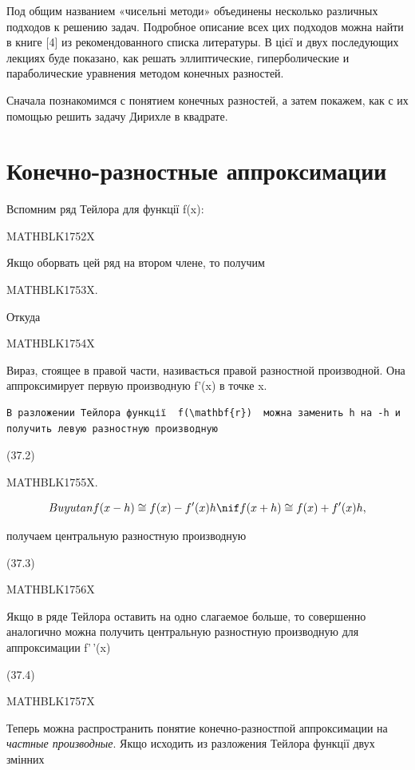 \documentclass[
  ukrainian,
]{article}
\begin{document}
Под общим названием «чисельні методи» объединены несколько различных
подходов к решению задач. Подробное описание всех цих подходов можна
найти в книге {[}4{]} из рекомендованного списка литературы. В цієї и
двух последующих лекциях буде показано, как решать эллиптические,
гиперболические и параболические уравнения методом конечных разностей.

Сначала познакомимся с понятием конечных разностей, а затем покажем, как
с их помощью решить задачу Дирихле в квадрате.

\section{Конечно-разностные
аппроксимации}\label{ux43aux43eux43dux435ux447ux43dux43e-ux440ux430ux437ux43dux43eux441ux442ux43dux44bux435-ux430ux43fux43fux440ux43eux43aux441ux438ux43cux430ux446ux438ux438}

Вспомним ряд Тейлора для функції f(x):

MATHBLK1752X

Якщо оборвать цей ряд на втором члене, то получим

MATHBLK1753X.

Откуда

MATHBLK1754X

Вираз, стоящее в правой части, називається правой разностной
производной. Она аппроксимирует первую производную f'(x) в точке x.

\begin{verbatim}
В разложении Тейлора функції  f(\mathbf{r})  можна заменить h на -h и получить левую разностную производную
\end{verbatim}

(37.2)

MATHBLK1755X.

\[
Buyutan  f(x - h) \cong f(x) - f'(x) h  \nif  f(x + h) \cong f( x) + f'(x) h  ,
\]

получаем центральную разностную производную

(37.3)

MATHBLK1756X

Якщо в ряде Тейлора оставить на одно слагаемое больше, то совершенно
аналогично можна получить центральную разностную производную для
аппроксимации f'\,'(x)

(37.4)

MATHBLK1757X

Теперь можна распространить понятие конечно-разностпой аппроксимации на
\emph{частные производные}. Якщо исходить из разложения Тейлора функції
двух змінних
\end{document}
